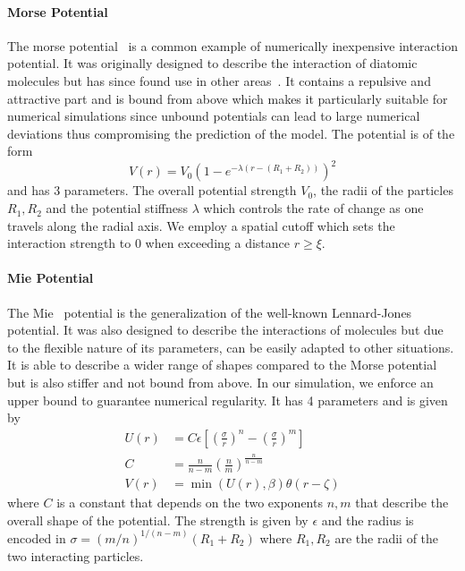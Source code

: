\documentclass{article}
\begin{document}
\paragraph{Morse Potential}
The morse potential~\cite{Morse1929} is a common example of numerically inexpensive interaction
potential.
It was originally designed to describe the interaction of diatomic molecules but has since found use
in other areas~\cite{Breitwieser2021}.
It contains a repulsive and attractive part and is bound from above which makes it particularly
suitable for numerical simulations since unbound potentials can lead to large numerical deviations
thus compromising the prediction of the model.
The potential is of the form
\begin{equation}
    V(r) = V_0\left(1-e^{-\lambda(r-(R_1+R_2))}\right)^2
\end{equation}
and has 3 parameters.
The overall potential strength $V_0$, the radii of the particles $R_1,R_2$ and the potential
stiffness $\lambda$ which controls the rate of change as one travels along the radial axis.
We employ a spatial cutoff which sets the interaction strength to $0$ when exceeding a distance
$r\geq\xi$.

\paragraph{Mie Potential}
The Mie~\cite{Mie1903} potential is the generalization of the well-known
Lennard-Jones~\cite{Jones1924} potential.
It was also designed to describe the interactions of molecules but due to the flexible nature of its
parameters, can be easily adapted to other situations.
It is able to describe a wider range of shapes compared to the Morse potential but is also stiffer
and not bound from above.
In our simulation, we enforce an upper bound to guarantee numerical regularity.
It has 4 parameters and is given by
\begin{align}
    U(r) &= C\epsilon\left[ \left(\frac{\sigma}{r}\right)^n -
        \left(\frac{\sigma}{r}\right)^m\right]\\
    C &= \frac{n}{n-m}\left(\frac{n}{m}\right)^{\frac{n}{n-m}}\\
    V(r) &= \min(U(r), \beta)\theta(r-\zeta)
\end{align}
where $C$ is a constant that depends on the two exponents $n,m$ that describe the overall shape of
the potential.
The strength is given by $\epsilon$ and the radius is encoded in $\sigma =
(m/n)^{1/(n-m)}(R_1+R_2)$ where $R_1,R_2$ are the radii of the two interacting particles.
\end{document}
